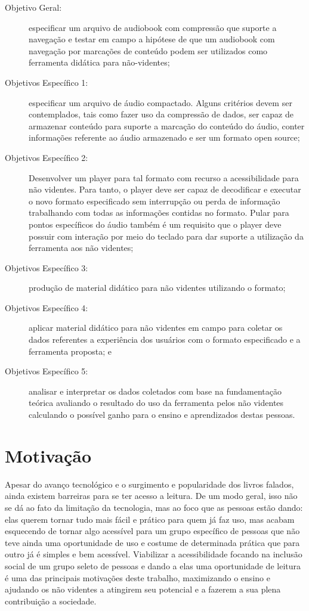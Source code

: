 \begin{description}
	\item [Objetivo Geral:] especificar um arquivo de audiobook com compressão que suporte a navegação e testar em campo a hipótese de que um audiobook com navegação por marcações de conteúdo podem ser utilizados como ferramenta didática para não-videntes;
	\item [Objetivos Específico 1:] especificar um arquivo de áudio compactado. Alguns critérios devem ser contemplados, tais como fazer uso da compressão de dados, ser capaz de armazenar conteúdo para suporte a marcação do conteúdo do áudio, conter informações referente ao áudio armazenado e ser um formato open source;
	\item [Objetivos Específico 2:] Desenvolver um player para tal formato com recurso a acessibilidade para não videntes. Para tanto, o player deve ser capaz de decodificar e executar o novo formato especificado sem interrupção ou perda de informação trabalhando com todas as informações contidas no formato. Pular para pontos específicos do áudio também é um requisito que o player deve possuir  com interação por meio do teclado para dar suporte a utilização da ferramenta aos não videntes;
	\item [Objetivos Específico 3:] produção de material didático para não videntes utilizando o formato;
	\item [Objetivos Específico 4:] aplicar material didático para não videntes em campo para coletar os dados referentes a experiência dos usuários com o formato especificado e a ferramenta proposta; e
	\item [Objetivos Específico 5:] analisar e interpretar os dados coletados com base na fundamentação teórica avaliando o resultado do uso da ferramenta pelos não videntes calculando o possível ganho para o ensino e aprendizados destas pessoas.
\end{description}

\section{Motivação}

Apesar do avanço tecnológico e o surgimento e popularidade dos livros falados, ainda existem barreiras para se ter acesso a leitura. De um modo geral, isso não se dá ao fato da limitação da tecnologia, mas ao foco que as pessoas estão dando: elas querem tornar tudo mais fácil e prático para quem já faz uso, mas acabam esquecendo de tornar algo acessível para um grupo específico de pessoas que não teve ainda uma oportunidade de uso e costume de determinada prática que para outro já é simples e bem acessível. Viabilizar a acessibilidade focando na inclusão social de um grupo seleto de pessoas e dando a elas uma oportunidade de leitura é uma das principais motivações deste trabalho, maximizando o ensino e ajudando os não videntes a atingirem seu potencial e a fazerem a sua plena contribuição a sociedade.

